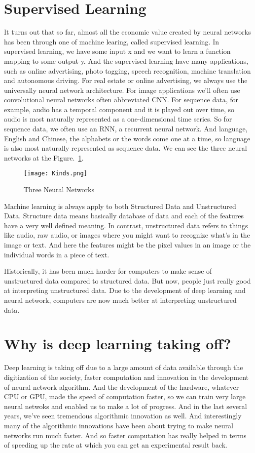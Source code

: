 \documentclass{article}
\begin{document}
\section{Supervised Learning}
 \par It turns out that so far, almost all the economic value created by neural networks has been through one of machine learing, called supervised learning. In supervised learning, we have some input x and we want to learn a function mapping to some output y. And the supervised learning have many applications, such as online advertising, photo tagging, speech recognition, machine translation and autonomous driving. For real estate or online advertising, we always use the universally neural network architecture. For image applications we'll often use convolutional neural networks often abbreviated CNN. For sequence data, for example, audio has a temporal component and it is played out over time, so audio is most naturally represented as a one-dimensional time series. So for sequence data, we often use an RNN, a recurrent neural network. And language, English and Chinese, the alphabets or the words come one at a time, so language is also most naturally represented as sequence data. We can see the three neural networks at the Figure.~\ref{kinds}.
\begin{figure}[htbp]
 \centering
 \texttt{[image: Kinds.png]}
 \caption{Three Neural Networks}
 \label{kinds}
\end{figure}
 \par Machine learning is always apply to both Structured Data and Unstructured Data. Structure data means basically database of data and each of the features have a very well defined meaning. In contrast, unstructured data refers to things like audio, raw audio, or images where you might want to recognize what's in the image or text. And here the features might be the pixel values in an image or the individual words in a piece of text. 
 \par Historically, it has been much harder for computers to make sense of unstructured data compared to structured data. But now, people just really good at interpreting unstructured data. Due to the development of deep learning and neural network, computers are now much better at interpreting unstructured data.
\section{Why is deep learning taking off? }
 \par Deep learning is taking off due to a large amount of data available through the digitization of the society, faster computation and innovation in the development of neural network algorithm. And the development of the hardware, whatever CPU or GPU, made the speed of computation faster, so we can train very large neural netwoks and enabled us to make a lot of progress. And in the last several years, we've seen tremendous algorithmic innovation as well. And interestingly many of the algorithmic innovations have been about trying to make neural networks run much faster. And so faster computation has really helped in terms of speeding up the rate at which you can get an experimental result back.
\end{document}
